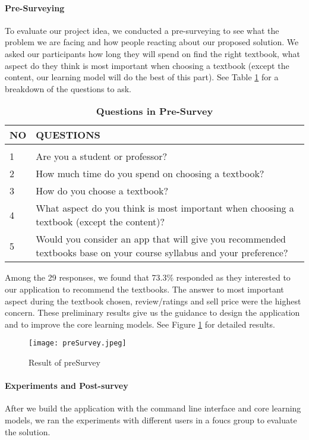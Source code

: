 \paragraph{Pre-Surveying}
To evaluate our project idea, we conducted a pre-surveying to see what the problem we are facing and how people reacting about our proposed solution. We asked our participants how long they will spend on find the right textbook, what aspect do they think is most important when choosing a textbook (except the content, our learning model will do the best of this part). See Table \ref{Pre-survey} for a breakdown of the questions to ask.
\begin{table}[!htbp]
\caption{\bf Questions in Pre-Survey} 
\label{Pre-survey}
\begin{center}
\begin{tabular}{  l  p{5cm} }
\bf NO & \bf QUESTIONS\\ \hline \\
1 & Are you a student or professor?\\
2 & How much time do you spend on choosing a textbook?\\
3 & How do you choose a textbook?\\
4 & What aspect do you think is most important when choosing a textbook (except the content)? \\
5 & Would you consider an app that will give you recommended textbooks base on your course syllabus and your preference? \\
\end{tabular} 
\end{center}
\end{table}
Among the 29 responses, we found that 73.3\% responded as they interested to our application to recommend the textbooks. The answer to most important aspect during the textbook chosen, review/ratings and sell price were the highest concern. These preliminary results give us the guidance to design the application and to improve the core learning models. See Figure \ref{result_of_presurvey} for detailed results.

\begin{figure}[ht]
\caption{Result of preSurvey}
\label{result_of_presurvey}
\centering
\texttt{[image: preSurvey.jpeg]}
\end{figure}

\paragraph{Experiments and Post-survey}
After we build the application with the command line interface and core learning models, we ran the experiments with different users in a foucs group to evaluate the solution.

